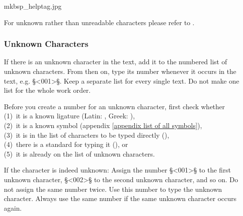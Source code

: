 \begin{sampleImage}{mkbsp_helptag.jpg}

\end{sampleImage}

\begin{crossref}
For unknown rather than unreadable characters please refer to . 
\end{crossref}


\subsubsection{Unknown Characters}
\label{section unknown characters}

\begin{mainrule}
If there is an unknown character in the text, add it to the numbered
list of unknown characters. From then on, type its number whenever it
occurs in the text, e.g. §<001>§. Keep a separate list for every
single text. Do not make one list for the whole work order.
\end{mainrule}
 
\begin{clarification}
Before you create a number for an unknown character, first check whether \\
(1)~it is a known ligature (Latin: , Greek: ), \\
(2)~it is a known symbol (appendix \ref{appendix list of all symbols}), \\
(3)~it is in the list of characters to be typed directly (), \\
(4)~there is a standard for typing it (), or \\
(5)~it is already on the list of unknown characters.
 \end{clarification}

\begin{clarification}
If the character is indeed unknown: Assign the number §<001>§ to the first unknown character, §<002>§ to the second unknown character, and so on. Do not assign the same number twice. Use this number to type the unknown character. Always use the same number if the same unknown character occurs again. 
\end{clarification}

